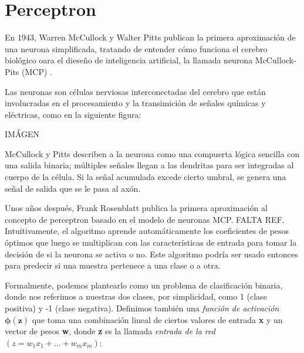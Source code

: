 \section{Perceptron}
En 1943, Warren McCullock y Walter Pitts publican la primera aproximación de una
neurona simplificada, tratando de entender cómo funciona el cerebro biológico oara
el dieseño de inteligencia artificial, la llamada neurona McCullock-Pits (MCP)
\cite[see p10]{python}.

Las neuronas son células nerviosas interconectadas del cerebro que están involucradas
en el procesamiento y la transimición de señales químicas y eléctricas, como en la
siguiente figura:
\cite[e.g. page 300]{einstein}
\cite{einstein}

IMÁGEN

McCullock y Pitts describen a la neurona como una compuerta lógica sencilla con una
salida binaria; múltiples señales llegan a las dendritas para ser integradas al cuerpo
de la célula. Si la señal acumulada excede cierto umbral, se genera una señal de salida
que se le pasa al axón.

Unos años después, Frank Rosenblatt publica la primera aproximación al concepto de
perceptron basado en el modelo de neuronas MCP. FALTA REF. Intuitivamente, el algoritmo
aprende automáticamente los coeficientes de pesos óptimos que luego se multiplican
con las características de entrada para tomar la decisión de si la neurona se activa
o no. Este algoritmo podría ser usado entonces para predecir si una muestra pertenece
a una clase o a otra.

Formalmente, podemos plantearlo como un problema de clasificación binaria, donde nos
referimos a nuestras dos clases, por simplicidad, como 1 (clase positiva) y -1
(clase negativa). Definimos también una \textit{función de activación $\mathbf{\phi (z)}$}
que toma una combinación lineal de ciertos valores de entrada \textbf{x} y un
vector de pesos \textbf{w}, donde \textbf{z} es la llamada \textit{entrada de la red}
$(z = w_1x_1 + ... + w_mx_m)$:

